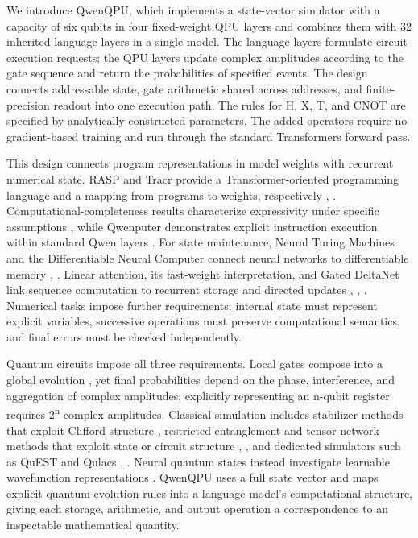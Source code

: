\documentclass[11pt,a4paper]{article}
\begin{document}
We introduce QwenQPU, which implements a state-vector simulator with a capacity of six qubits in four fixed-weight QPU layers and combines them with 32 inherited language layers in a single model. The language layers formulate circuit-execution requests; the QPU layers update complex amplitudes according to the gate sequence and return the probabilities of specified events. The design connects addressable state, gate arithmetic shared across addresses, and finite-precision readout into one execution path. The rules for H, X, T, and CNOT are specified by analytically constructed parameters. The added operators require no gradient-based training and run through the standard Transformers forward pass.

This design connects program representations in model weights with recurrent numerical state. RASP and Tracr provide a Transformer-oriented programming language and a mapping from programs to weights, respectively \cite{ref5}, \cite{ref6}. Computational-completeness results characterize expressivity under specific assumptions \cite{ref7}, while Qwenputer demonstrates explicit instruction execution within standard Qwen layers \cite{ref8}. For state maintenance, Neural Turing Machines and the Differentiable Neural Computer connect neural networks to differentiable memory \cite{ref9}, \cite{ref10}. Linear attention, its fast-weight interpretation, and Gated DeltaNet link sequence computation to recurrent storage and directed updates \cite{ref11}, \cite{ref12}, \cite{ref13}. Numerical tasks impose further requirements: internal state must represent explicit variables, successive operations must preserve computational semantics, and final errors must be checked independently.

Quantum circuits impose all three requirements. Local gates compose into a global evolution \cite{ref14}, yet final probabilities depend on the phase, interference, and aggregation of complex amplitudes; explicitly representing an n-qubit register requires 2\textsuperscript{n} complex amplitudes. Classical simulation includes stabilizer methods that exploit Clifford structure \cite{ref15}, restricted-entanglement and tensor-network methods that exploit state or circuit structure \cite{ref16}, \cite{ref17}, and dedicated simulators such as QuEST and Qulacs \cite{ref18}, \cite{ref19}. Neural quantum states instead investigate learnable wavefunction representations \cite{ref20}. QwenQPU uses a full state vector and maps explicit quantum-evolution rules into a language model's computational structure, giving each storage, arithmetic, and output operation a correspondence to an inspectable mathematical quantity.
\end{document}
